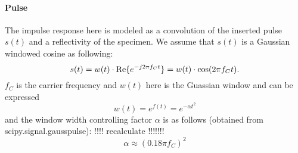 \documentclass{article}
\begin{document}
\paragraph*{Pulse}
The impulse response here is modeled as a convolution of the inserted pulse $s(t)$ and a reflectivity of the specimen. We assume that $s(t)$ is a Gaussian windowed cosine as following:
\begin{equation}
s(t)  = w(t) \cdot \operatorname{Re} \{ e^{- j 2 \pi f_C t} \} = w(t) \cdot \cos(2 \pi f_C t).
\end{equation}
%
$f_C$ is the carrier frequency and $w(t)$ here is the Guassian window and can be expressed\\
\begin{equation} \label{eq:window}
w(t) = e^{f(t)} = e ^{- \alpha t^2}
\end{equation}
%
and the window width controlling factor $\alpha$ is as follows (obtained from scipy.signal.gausspulse): !!!! recalculate !!!!!!!
\begin{equation}
\alpha \approx (0.18 \pi f_C)^2 
\end{equation}
\end{document}
